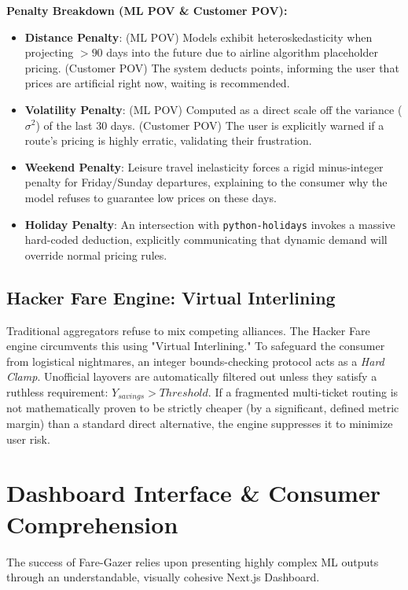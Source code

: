 \documentclass[12pt, a4paper]{article}
\begin{document}
\textbf{Penalty Breakdown (ML POV \& Customer POV):}
\begin{itemize}
    \item \textbf{Distance Penalty}: (ML POV) Models exhibit heteroskedasticity when projecting $>90$ days into the future due to airline algorithm placeholder pricing. (Customer POV) The system deducts points, informing the user that prices are artificial right now, waiting is recommended.
    \item \textbf{Volatility Penalty}: (ML POV) Computed as a direct scale off the variance ($\sigma^2$) of the last 30 days. (Customer POV) The user is explicitly warned if a route's pricing is highly erratic, validating their frustration.
    \item \textbf{Weekend Penalty}: Leisure travel inelasticity forces a rigid minus-integer penalty for Friday/Sunday departures, explaining to the consumer why the model refuses to guarantee low prices on these days.
    \item \textbf{Holiday Penalty}: An intersection with \texttt{python-holidays} invokes a massive hard-coded deduction, explicitly communicating that dynamic demand will override normal pricing rules.
\end{itemize}

\subsection{Hacker Fare Engine: Virtual Interlining}
Traditional aggregators refuse to mix competing alliances. The Hacker Fare engine circumvents this using "Virtual Interlining." 
To safeguard the consumer from logistical nightmares, an integer bounds-checking protocol acts as a \textit{Hard Clamp}. Unofficial layovers are automatically filtered out unless they satisfy a ruthless requirement:
$Y_{savings} > Threshold$. If a fragmented multi-ticket routing is not mathematically proven to be strictly cheaper (by a significant, defined metric margin) than a standard direct alternative, the engine suppresses it to minimize user risk. 

\newpage

\section{Dashboard Interface \& Consumer Comprehension}

The success of Fare-Gazer relies upon presenting highly complex ML outputs through an understandable, visually cohesive Next.js Dashboard.
\end{document}
